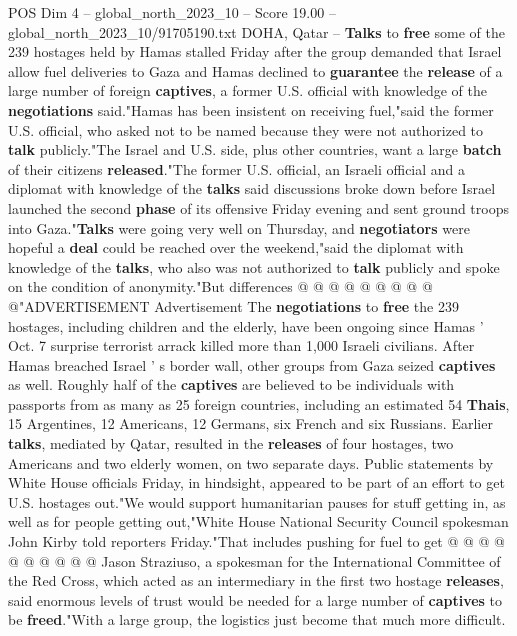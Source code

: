 \begin{textsample}{POS Dim 4 – global\_north\_2023\_10 – Score 19.00 – global\_north\_2023\_10/91705190.txt}  \label{ex:f4_pos_441}
DOHA, Qatar -- \textbf{Talks} to \textbf{free} some of the 239 hostages held by Hamas stalled Friday after the group demanded that Israel allow fuel deliveries to Gaza and Hamas declined to \textbf{guarantee} the \textbf{release} of a large number of foreign \textbf{captives}, a former U.S. official with knowledge of the \textbf{negotiations} said."Hamas has been insistent on receiving fuel,"said the former U.S. official, who asked not to be named because they were not authorized to \textbf{talk} publicly."The Israel and U.S. side, plus other countries, want a large \textbf{batch} of their citizens \textbf{released}."The former U.S. official, an Israeli official and a diplomat with knowledge of the \textbf{talks} said discussions broke down before Israel launched the second \textbf{phase} of its offensive Friday evening and sent ground troops into Gaza."\textbf{Talks} were going very well on Thursday, and \textbf{negotiators} were hopeful a \textbf{deal} could be reached over the weekend,"said the diplomat with knowledge of the \textbf{talks}, who also was not authorized to \textbf{talk} publicly and spoke on the condition of anonymity."But differences @ @ @ @ @ @ @ @ @ @"ADVERTISEMENT Advertisement The \textbf{negotiations} to \textbf{free} the 239 hostages, including children and the elderly, have been ongoing since Hamas ' Oct. 7 surprise terrorist arrack killed more than 1,000 Israeli civilians.
After Hamas breached Israel ' s border wall, other groups from Gaza seized \textbf{captives} as well.
Roughly half of the \textbf{captives} are believed to be individuals with passports from as many as 25 foreign countries, including an estimated 54 \textbf{Thais}, 15 Argentines, 12 Americans, 12 Germans, six French and six Russians.
Earlier \textbf{talks}, mediated by Qatar, resulted in the \textbf{releases} of four hostages, two Americans and two elderly women, on two separate days.
Public statements by White House officials Friday, in hindsight, appeared to be part of an effort to get U.S. hostages out."We would support humanitarian pauses for stuff getting in, as well as for people getting out,"White House National Security Council spokesman John Kirby told reporters Friday."That includes pushing for fuel to get @ @ @ @ @ @ @ @ @ @ Jason Straziuso, a spokesman for the International Committee of the Red Cross, which acted as an intermediary in the first two hostage \textbf{releases}, said enormous levels of trust would be needed for a large number of \textbf{captives} to be \textbf{freed}."With a large group, the logistics just become that much more difficult.

\end{textsample}
